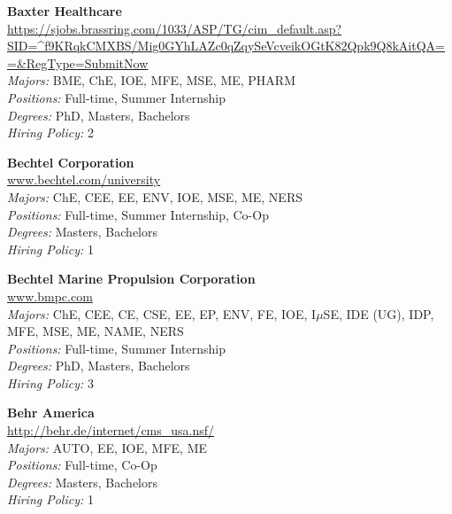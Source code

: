 \documentclass[twoside]{article}
\begin{document}
\begin{center}
\begin{multicols}{3}
\begin{minipage}{.9\columnwidth}{\Large\bf Baxter Healthcare }\\
	\url{https://sjobs.brassring.com/1033/ASP/TG/cim_default.asp?SID=^f9KRqkCMXBS/Mig0GYhLAZc0qZqySeVcveikOGtK82Qpk9Q8kAitQA==&RegType=SubmitNow}\\
	\emph{Majors:} BME, ChE, IOE, MFE, MSE, ME, PHARM\\
	\emph{Positions:} Full-time, Summer Internship\\
	\emph{Degrees:} PhD, Masters, Bachelors\\
	\emph{Hiring Policy:} 2\\
\end{minipage}
 
\begin{minipage}{.9\columnwidth}{\Large\bf Bechtel Corporation }\\
	\url{www.bechtel.com/university}\\
	\emph{Majors:} ChE, CEE, EE, ENV, IOE, MSE, ME, NERS\\
	\emph{Positions:} Full-time, Summer Internship, Co-Op\\
	\emph{Degrees:} Masters, Bachelors\\
	\emph{Hiring Policy:} 1\\
\end{minipage}
 
\begin{minipage}{.9\columnwidth}{\Large\bf Bechtel Marine Propulsion Corporation }\\
	\url{www.bmpc.com}\\
	\emph{Majors:} ChE, CEE, CE, CSE, EE, EP, ENV, FE, IOE, I$\mu$SE, IDE (UG), IDP, MFE, MSE, ME, NAME, NERS\\
	\emph{Positions:} Full-time, Summer Internship\\
	\emph{Degrees:} PhD, Masters, Bachelors\\
	\emph{Hiring Policy:} 3\\
\end{minipage}
 
\begin{minipage}{.9\columnwidth}{\Large\bf Behr America }\\
	\url{http://behr.de/internet/cms_usa.nsf/}\\
	\emph{Majors:} AUTO, EE, IOE, MFE, ME\\
	\emph{Positions:} Full-time, Co-Op\\
	\emph{Degrees:} Masters, Bachelors\\
	\emph{Hiring Policy:} 1\\
\end{minipage}
 

\end{multicols}
\end{center}
\end{document}
